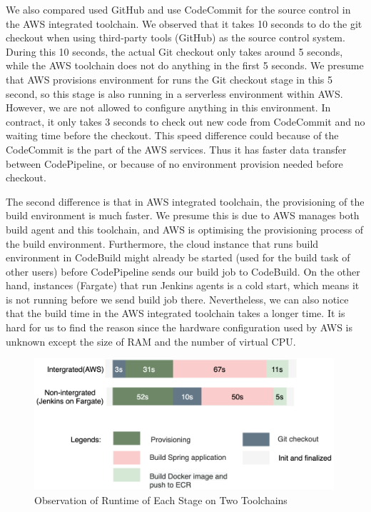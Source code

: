 \par
We also compared used GitHub and use CodeCommit for the source control in the AWS integrated toolchain. 
We observed that it takes 10 seconds to do the git checkout when using third-party tools (GitHub) as the source control system. During this 10 seconds, the actual Git checkout only takes around 5 seconds, while the AWS toolchain does not do anything in the first 5 seconds. We presume that AWS provisions environment for runs the Git checkout stage in this 5 second, so this stage is also running in a serverless environment within AWS. However, we are not allowed to configure anything in this environment. In contract, it only takes 3 seconds to check out new code from CodeCommit and no waiting time before the checkout. This speed difference could because of the CodeCommit is the part of the AWS services. Thus it has faster data transfer between CodePipeline, or because of no environment provision needed before checkout.
\par
 The second difference is that in AWS integrated toolchain, the provisioning of the build environment is much faster. We presume this is due to AWS manages both build agent and this toolchain, and AWS is optimising the provisioning process of the build environment. Furthermore, the cloud instance that runs build environment in CodeBuild might already be started (used for the build task of other users) before CodePipeline sends our build job to CodeBuild. On the other hand, instances (Fargate) that run Jenkins agents is a cold start, which means it is not running before we send build job there.
 Nevertheless, we can also notice that the build time in the AWS integrated toolchain takes a longer time. It is hard for us to find the reason since the hardware configuration used by AWS is unknown except the size of RAM and the number of virtual CPU.
\begin{figure}[h]
    \centering
    \includegraphics[width=0.99\textwidth]{pics/stages.png}
    \caption{Observation of Runtime of Each Stage on Two Toolchains}
    \label{fig:stage_runtime}
    \end{figure}
